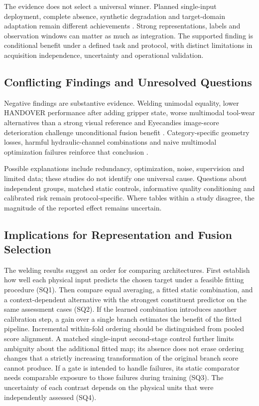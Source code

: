The evidence does not select a universal winner. Planned single-input deployment, complete absence, synthetic degradation and target-domain adaptation remain different achievements \citep{Li2025PGMTKD,Altinses2023Fuzzy,P051}. Strong representations, labels and observation windows can matter as much as integration. The supported finding is conditional benefit under a defined task and protocol, with distinct limitations in acquisition independence, uncertainty and operational validation.

\subsection{Conflicting Findings and Unresolved Questions}
Negative findings are substantive evidence. Welding unimodal equality, lower HANDOVER performance after adding gripper state, worse multimodal tool-wear alternatives than a strong visual reference and Eyecandies image-score deterioration challenge unconditional fusion benefit \citep{Hua2026Weld,Thoduka2024Handover,P045,P033}. Category-specific geometry losses, harmful hydraulic-channel combinations and naive multimodal optimization failures reinforce that conclusion \citep{Horwitz2023Back,Bonfiglioli2023The,Goodarzi2023Deep,Wang2020What}.

Possible explanations include redundancy, optimization, noise, supervision and limited data; these studies do not identify one universal cause. Questions about independent groups, matched static controls, informative quality conditioning and calibrated risk remain protocol-specific. Where tables within a study disagree, the magnitude of the reported effect remains uncertain.

\subsection{Implications for Representation and Fusion Selection}
The welding results suggest an order for comparing architectures. First establish how well each physical input predicts the chosen target under a feasible fitting procedure (SQ1). Then compare equal averaging, a fitted static combination, and a context-dependent alternative with the strongest constituent predictor on the same assessment cases (SQ2). If the learned combination introduces another calibration step, a gain over a single branch estimates the benefit of the fitted pipeline. Incremental within-fold ordering should be distinguished from pooled score alignment. A matched single-input second-stage control further limits ambiguity about the additional fitted map; its absence does not erase ordering changes that a strictly increasing transformation of the original branch score cannot produce. If a gate is intended to handle failures, its static comparator needs comparable exposure to those failures during training (SQ3). The uncertainty of each contrast depends on the physical units that were independently assessed (SQ4).

